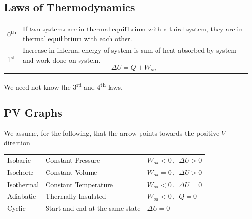 \documentclass[a4paper,11pt]{article}
\begin{document}
		\subsection{Laws of Thermodynamics}
			\begin{center}
				\renewcommand{\arraystretch}{1.2}
				\begin{tabular}{@{} l p{14cm} @{}}
					\toprule
					0\textsuperscript{th} & If two systems are in thermal equilibrium with a third system, they are in thermal equilibrium with each other. \\
					1\textsuperscript{st} & Increase in internal energy of system is sum of heat absorbed by system and work done on system. $$\Delta U = Q + W_{on}$$ \vspace*{-\baselineskip} \\
					\bottomrule
				\end{tabular}
			\end{center}
			We need not know the 3\textsuperscript{rd} and 4\textsuperscript{th} laws.
		\newpage
		\subsection{PV Graphs}
			We assume, for the following, that the arrow points towards the positive-$V$ direction. 
			\begin{center}
				\renewcommand{\arraystretch}{1.2}
				\begin{tabular}{@{} l l l @{}}
					\toprule
					Isobaric & Constant Pressure  & $W_{on} < 0 ~,~~ \Delta U > 0$\\
					Isochoric & Constant Volume & $W_{on} = 0 ~,~~ \Delta U > 0$\\
					Isothermal & Constant Temperature & $W_{on} < 0 ~,~~ \Delta U = 0$\\
					Adiabatic & Thermally Insulated & $W_{on} < 0 ~,~~ Q = 0$\\
					Cyclic & Start and end at the same state & $\Delta U = 0$\\
					\bottomrule
				\end{tabular}
			\end{center}
\end{document}
